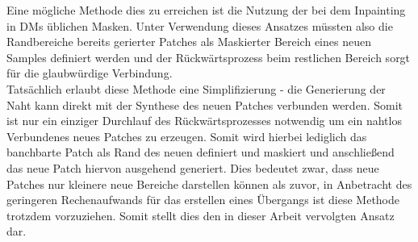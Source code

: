 Eine mögliche Methode dies zu erreichen ist die Nutzung der bei dem Inpainting in \ac{DM}s üblichen Masken. Unter Verwendung dieses Ansatzes müssten also die Randbereiche bereits gerierter Patches als Maskierter Bereich eines neuen Samples definiert werden und der Rückwärtsprozess beim restlichen Bereich sorgt für die glaubwürdige Verbindung. \\ 
Tatsächlich erlaubt diese Methode eine Simplifizierung - die Generierung der Naht kann direkt mit der Synthese des neuen Patches verbunden werden. Somit ist nur ein einziger Durchlauf des Rückwärtsprozesses notwendig um ein nahtlos Verbundenes neues Patches zu erzeugen. Somit wird hierbei lediglich das banchbarte Patch als Rand des neuen definiert und maskiert und anschließend das neue Patch hiervon ausgehend generiert. Dies bedeutet zwar, dass neue Patches nur kleinere neue Bereiche darstellen können als zuvor, in Anbetracht des geringeren Rechenaufwands für das erstellen eines Übergangs ist diese Methode trotzdem vorzuziehen. Somit stellt dies den in dieser Arbeit vervolgten Ansatz dar.

